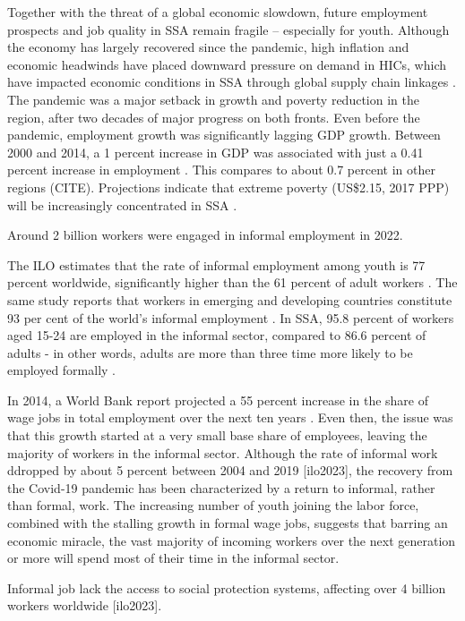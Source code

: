 \documentclass[
  a4paper, twoside, 12pt]{book}
\begin{document}
Together with the threat of a global economic slowdown, future employment prospects and job quality in SSA remain fragile -- especially for youth. Although the economy has largely recovered since the pandemic, high inflation and economic headwinds have placed downward pressure on demand in HICs, which have impacted economic conditions in SSA through global supply chain linkages \autocite{ilo2023}. The pandemic was a major setback in growth and poverty reduction in the region, after two decades of major progress on both fronts. Even before the pandemic, employment growth was significantly lagging GDP growth. Between 2000 and 2014, a 1 percent increase in GDP was associated with just a 0.41 percent increase in employment \autocite{africandevelopmentbank2019}. This compares to about 0.7 percent in other regions (CITE). Projections indicate that extreme poverty (US\$2.15, 2017 PPP) will be increasingly concentrated in SSA \autocite{worldbank2022}.

Around 2 billion workers were engaged in informal employment in 2022.

The ILO estimates that the rate of informal employment among youth is 77 percent worldwide, significantly higher than the 61 percent of adult workers \autocite{bonnet2018}. The same study reports that workers in emerging and developing countries constitute 93 per cent of the world's informal employment \autocite{bonnet2018}. In SSA, 95.8 percent of workers aged 15-24 are employed in the informal sector, compared to 86.6 percent of adults - in other words, adults are more than three time more likely to be employed formally \autocite{kiaga2020}.

In 2014, a World Bank report projected a 55 percent increase in the share of wage jobs in total employment over the next ten years \autocite{filmer2014}. Even then, the issue was that this growth started at a very small base share of employees, leaving the majority of workers in the informal sector. Although the rate of informal work ddropped by about 5 percent between 2004 and 2019 {[}ilo2023{]}, the recovery from the Covid-19 pandemic has been characterized by a return to informal, rather than formal, work. The increasing number of youth joining the labor force, combined with the stalling growth in formal wage jobs, suggests that barring an economic miracle, the vast majority of incoming workers over the next generation or more will spend most of their time in the informal sector.

Informal job lack the access to social protection systems, affecting over 4 billion workers worldwide {[}ilo2023{]}.
\end{document}
